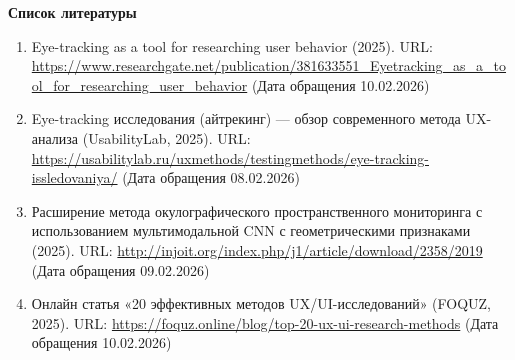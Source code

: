 \documentclass[12pt,a4paper]{article}
\begin{document}
\bigskip
\noindent\textbf{Список литературы}

{\sloppy
\begin{enumerate}[label=\arabic*), leftmargin=1.8em, itemsep=0.4em]

    \item Eye-tracking as a tool for researching user behavior (2025).
    URL: \url{https://www.researchgate.net/publication/381633551_Eyetracking_as_a_tool_for_researching_user_behavior}
    (Дата обращения 10.02.2026)

    \item Eye-tracking исследования (айтрекинг) --- обзор современного метода
    UX-анализа (UsabilityLab, 2025).
    URL: \url{https://usabilitylab.ru/uxmethods/testingmethods/eye-tracking-issledovaniya/}
    (Дата обращения 08.02.2026)

    \item Расширение метода окулографического пространственного мониторинга
    с использованием мультимодальной CNN с геометрическими признаками (2025).
    URL: \url{http://injoit.org/index.php/j1/article/download/2358/2019}
    (Дата обращения 09.02.2026)

    \item Онлайн статья «20 эффективных методов UX/UI-исследований»
    (FOQUZ, 2025).
    URL: \url{https://foquz.online/blog/top-20-ux-ui-research-methods}
    (Дата обращения 10.02.2026)

\end{enumerate}
}
\end{document}

